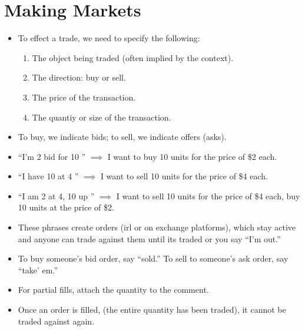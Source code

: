 \documentclass{article}
\begin{document}
\section{Making Markets}
\begin{itemize}
\item To effect a trade, we need to specify the following:
\begin{enumerate}
\item The object being traded (often implied by the context).
\item The direction: buy or sell.
\item The price of the transaction.
\item The quantiy or size of the transaction.
\end{enumerate}
\item To buy, we indicate bids; to sell, we indicate offers (asks).
\item ``I'm 2 bid for 10 '' $\implies$ I want to buy 10 units for the price of \$2 each.
\item ``I have 10 at 4 '' $\implies$ I want to sell 10 units for the price of \$4 each.
\item ``I am 2 at 4, 10 up '' $\implies$ I want to sell 10 units for the price of \$4 each, buy 10 units at the price of \$2.
\item These phrases create orders (irl or on exchange platforms), which stay active and anyone can trade against them until its traded or you say ``I'm out.''
\item To buy someone's bid order, say ``sold.'' To sell to someone's ask order, say ``take' em.'' 
\item For partial fills, attach the quantity to the comment.
\item Once an order is filled, (the entire quantity has been traded), it cannot be traded against again.
\end{itemize}
\end{document}
